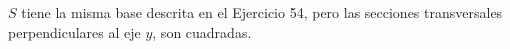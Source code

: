 \item $S$ tiene la misma base descrita en el Ejercicio 54, pero las secciones transversales perpendiculares al eje $y$, son cuadradas.
